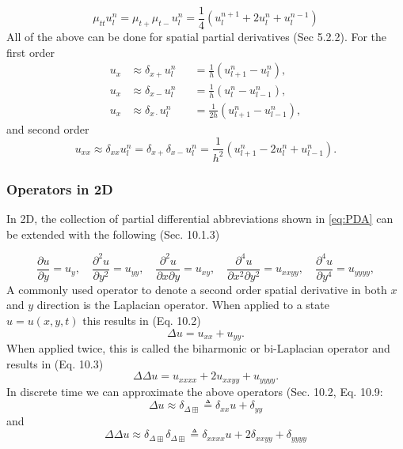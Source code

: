 \documentclass{article}
\begin{document}
\begin{equation}
    \mu_{tt} u_l^n = \mu_{t+}\mu_{t-}u_l^n = \frac{1}{4}(u_l^{n+1}+2u_l^n+u_l^{n-1})
\end{equation}
All of the above can be done for spatial partial derivatives (Sec 5.2.2). For the first order 
\begin{subequations}\label{eq:firstOrderSpace}
\begin{alignat}{2}
    u_x &\approx \delta_{x+}u_l^n &&= \frac{1}{h} (u_{l+1}^n - u_l^n),\\
    u_x &\approx \delta_{x-}u_l^n &&= \frac{1}{h} (u_l^n - u_{l-1}^n),\\
    u_x &\approx \delta_{x\cdot}u_l^n &&= \frac{1}{2h} (u_{l+1}^n - u_{l-1}^n),
\end{alignat}
\end{subequations}
and second order 
\begin{equation}\label{eq:secondOrderSpace}
    u_{xx} \approx \delta_{xx}u_l^n = \delta_{x+}\delta_{x-}u_l^n = \frac{1}{h^2} (u_{l+1}^n - 2u_l^n + u_{l-1}^n).
\end{equation}

\subsubsection{Operators in 2D}\label{subsec:2Doperators}
In 2D, the collection of partial differential abbreviations shown in \eqref{eq:PDA} can be extended with the following (Sec. 10.1.3)

\begin{equation}
    \frac{\partial u}{\partial y} = u_{y}, \quad \frac{\partial^2 u}{\partial y^2} = u_{yy}, \quad
    \frac{\partial^2 u}{\partial x\partial y} = u_{xy}, \quad
    \frac{\partial^4 u}{\partial x^2\partial y^2} = u_{xxyy}, \quad
    \frac{\partial^4 u}{\partial y^4} = u_{yyyy},
\end{equation}
A commonly used operator to denote a second order spatial derivative in both $x$ and $y$ direction is the Laplacian operator. When applied to a state $u=u(x,y,t)$ this results in (Eq. 10.2)
\begin{equation}
    \Delta u = u_{xx} + u_{yy}.
\end{equation}
When applied twice, this is called the biharmonic or bi-Laplacian operator and results in (Eq. 10.3) \begin{equation}
    \Delta\Delta u = u_{xxxx} + 2u_{xxyy} + u_{yyyy}.
\end{equation}
In discrete time we can approximate the above operators (Sec. 10.2, Eq. 10.9:
\begin{equation}
    \Delta u \approx \delta_{\Delta\boxplus} \triangleq \delta_{xx}u + \delta_{yy}
\end{equation}
and 
\begin{equation}
    \Delta\Delta u \approx \delta_{\Delta\boxplus}\delta_{\Delta\boxplus} \triangleq \delta_{xxxx}u + 2\delta_{xxyy} + \delta_{yyyy}
\end{equation}
\end{document}
